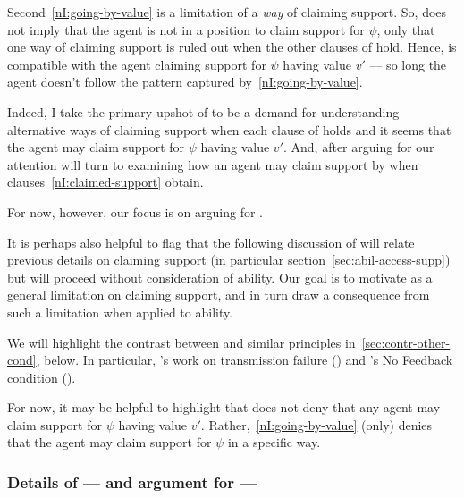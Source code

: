 \begin{note}
  Second~\ref{nI:going-by-value} is a limitation of a \emph{way} of claiming support.
  So, \nI{} does not imply that the agent is not in a position to claim support for \(\psi\), only that one way of claiming support is ruled out when the other clauses of \nI{} hold.
  Hence, \nI{} is compatible with the agent claiming support for \(\psi\) having value \(v'\) --- so long the agent doesn't follow the pattern captured by~\ref{nI:going-by-value}.

  Indeed, I take the primary upshot of \nI{} to be a demand for understanding alternative ways of claiming support when each clause of \nI{} holds and it seems that the agent may claim support for \(\psi\) having value \(v'\).
  And, after arguing for \nI{} our attention will turn to examining how an agent may claim support by \EAS{} when clauses~\ref{nI:claimed-support} obtain.

  For now, however, our focus is on arguing for \nI{}.

  It is perhaps also helpful to flag that the following discussion of \nI{} will relate previous details on claiming support (in particular section~\ref{sec:abil-access-supp}) but will proceed without consideration of ability.
  Our goal is to motivate \nI{} as a general limitation on claiming support, and in turn draw a consequence from such a limitation when applied to ability.
\end{note}

\begin{note}[Literature]
  We will highlight the contrast between \nI{} and similar principles in~\autoref{sec:contr-other-cond}, below.
  In particular, \citeauthor{Wright:2011wn}'s work on transmission failure (\Citeyear{Wright:2003aa,Wright:2011wn}) and \citeauthor{Weisberg:2010to}'s No Feedback condition (\Citeyear{Weisberg:2010to}).

  For now, it may be helpful to highlight that \nI{} does not deny that any agent may claim support for \(\psi\) having value \(v'\).
  Rather,~\ref{nI:going-by-value} (only) denies that the agent may claim support for \(\psi\) in a specific way.
\end{note}

\newpage

\subsubsection{Details of --- and argument for --- \nI{}}
\label{sec:details-ni}
\label{sec:re-do-ni}


